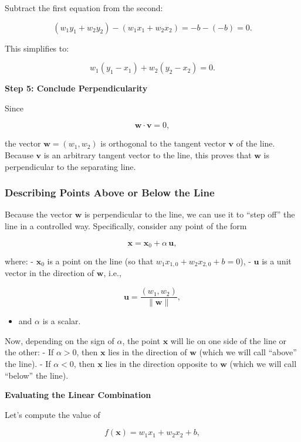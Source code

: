\documentclass[11pt]{article}
\providecommand{\tightlist}{%
      \setlength{\itemsep}{0pt}\setlength{\parskip}{0pt}}
\begin{document}
Subtract the first equation from the second:

$$
(w_1 y_1 + w_2 y_2) - (w_1 x_1 + w_2 x_2) = -b - (-b) = 0.
$$

This simplifies to:

$$
w_1 (y_1 - x_1) + w_2 (y_2 - x_2) = 0.
$$

\textbf{Step 5: Conclude Perpendicularity}

Since

$$
\mathbf{w} \cdot \mathbf{v} = 0,
$$

the vector $\mathbf{w} = (w_1, w_2)$ is orthogonal to the tangent
vector $\mathbf{v}$ of the line. Because $\mathbf{v}$ is an
arbitrary tangent vector to the line, this proves that $\mathbf{w}$ is
perpendicular to the separating line.

    \subsubsection{Describing Points Above or Below the
Line}\label{describing-points-above-or-below-the-line}

Because the vector $ \mathbf{w} $ is perpendicular to the line, we can
use it to ``step off'' the line in a controlled way. Specifically,
consider any point of the form

$$
\mathbf{x} = \mathbf{x}_0 + \alpha\, \mathbf{u},
$$

where: - $\mathbf{x}_0$ is a point on the line (so that
$w_1 x_{1,0} + w_2 x_{2,0} + b = 0$), - $\mathbf{u}$ is a unit
vector in the direction of $ \mathbf{w} $, i.e.,

$$
  \mathbf{u} = \frac{(w_1, w_2)}{\|\mathbf{w}\|},
  $$

\begin{itemize}
\tightlist
\item
  and $\alpha$ is a scalar.
\end{itemize}

Now, depending on the sign of $\alpha$, the point $\mathbf{x}$ will
lie on one side of the line or the other: - If $\alpha > 0$, then
$\mathbf{x}$ lies in the direction of $ \mathbf{w} $ (which we will
call ``above'' the line). - If $\alpha < 0$, then $\mathbf{x}$ lies
in the direction opposite to $ \mathbf{w} $ (which we will call
``below'' the line).

\textbf{Evaluating the Linear Combination}

Let's compute the value of

$$
f(\mathbf{x}) = w_1 x_1 + w_2 x_2 + b,
$$
\end{document}
